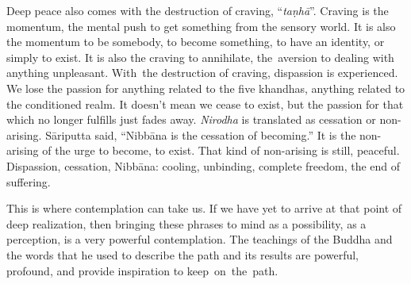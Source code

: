 Deep peace also comes with the destruction of craving, ``\emph{taṇhā}''. Craving is the momentum, the mental push to get something from the sensory world. It is also the momentum to be somebody, to become something, to have an identity, or simply to exist. It is also the craving to annihilate, \mbox{the aversion} to dealing with anything unpleasant. \mbox{With the} destruction of craving, dispassion is experienced. We lose the passion for anything related to the five khandhas, anything related to the conditioned realm. It doesn't mean we cease to exist, but the passion for that which no longer fulfills just fades away. \emph{Nirodha} is translated as cessation or non-arising. Sāriputta said, ``Nibbāna is the cessation of becoming.'' It is the non-arising of the urge to become, to exist. That kind of non-arising is still, peaceful. Dispassion, cessation, Nibbāna: cooling, unbinding, complete freedom, the end of suffering.

This is where contemplation can take us. If we have yet to arrive at that point of deep realization, then bringing these phrases to mind as a possibility, as a perception, is a very powerful contemplation. The teachings of the Buddha and the words that he used to describe the path and its results are powerful, profound, and provide inspiration to \mbox{keep on the path.}
